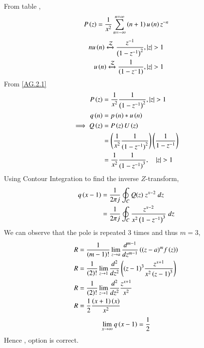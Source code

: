 \documentclass[beamer]{IEEEtran}
\theoremstyle{remark}
\begin{document}
From table ,
\begin{align}
	P\left(z\right)=\frac{1}{x^2}\sum_{n=-\infty}^{n=\infty}\left(n+1\right)u\left(n\right)z^{-n} \label{AG.2.1}
\end{align}
\begin{align}
	n u\left(n\right)\xleftrightarrow{\mathcal{Z}} \frac{z^{-1}}{\left(1-z^{-1}\right)^2} ,   \left\vert z\right\vert >1 \\
   u\left(n\right)\xleftrightarrow{\mathcal{Z}} \frac{1}{\left(1-z^-1\right)} ,   \left\vert z\right\vert >1  
\end{align}
From \eqref{AG.2.1}
\begin{align}
	P\left(z\right)&=\frac{1}{x^2}\frac{1}{\left(1-z^{-1}\right)^2} , \left\vert z\right\vert >1\\
	q\left(n\right)&=p\left(n\right)\ast u\left(n\right)\\
	\implies Q\left(z\right)&=P\left(z\right)U\left(z\right)   \\
	&=\left(\frac{1}{x^2}\frac{1}{({1-z^{-1})}^{2}}\right)\left(\frac{1}{1-z^{-1}}\right)  \\
	 &=\frac{1}{x^2}\frac{1}{({1-z^{-1})}^{3}} ,\quad \left\vert z\right\vert>1
\end{align}
Using Contour Integration to find the inverse $Z$-transform,
\begin{align}
    q\left(x-1\right)&=\frac{1}{2\pi j}\oint_{C}Q(z) \;z^{x-2} \;dz  \\
    &=\frac{1}{2\pi j}\oint_{C}\frac{z^{x-2}}{x^2\left(1-z^{-1}\right)^{3}} \;dz 
\end{align}
We can observe that the pole is repeated $3$ times and thus $m=3$,
\begin{align}
    R&=\frac{1}{\left(m-1\right)!}\lim\limits_{z\to a}\frac{d^{m-1}}{dz^{m-1}}\left({(z-a)}^{m}f\left(z\right)\right) \\
    R&=\frac{1}{\left(2\right)!}\lim\limits_{z\to 1}\frac{d^{2}}{dz^{2}}\left({(z-1)}^{3}\frac{z^{x+1}}{x^2\left(z-1\right)^3}\right) \\
    R&=\frac{1}{\left(2\right)!}\lim\limits_{z\to 1}\frac{d^{2}}{dz^{2}} \frac{z^{x+1}}{x^2} \\
    R&=\frac{1}{2}\frac{\left(x+1\right)\left(x\right)}{x^2} 
\end{align}
\begin{align}
    \lim_{x\to\infty}q\left(x-1\right)=\frac{1}{2}
\end{align}
Hence , option  is correct.
\end{document}
